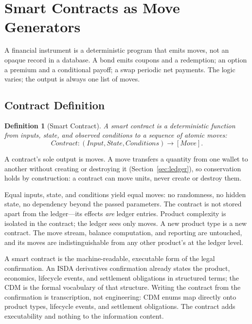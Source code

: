 \documentclass[11pt,a4paper]{article}
\newtheorem{definition}{Definition}[section]
\begin{document}
\section{Smart Contracts as Move Generators}
\label{sec:contracts}

A financial instrument is a deterministic program that emits moves, not an opaque record in a database. A bond emits coupons and a redemption; an option a premium and a conditional payoff; a swap periodic net payments. The logic varies; the output is always one list of moves.

\subsection{Contract Definition}

\begin{definition}[Smart Contract]
A smart contract is a deterministic function from inputs, state, and observed conditions to a sequence of atomic moves:
\[
\textit{Contract} : (\textit{Input}, \textit{State}, \textit{Conditions}) \to [\textit{Move}].
\]
\end{definition}

\noindent A contract's sole output is moves. A move transfers a quantity from one wallet to another without creating or destroying it (Section~\ref{sec:ledger}), so conservation holds by construction: a contract can move units, never create or destroy them.

\noindent Equal inputs, state, and conditions yield equal moves: no randomness, no hidden state, no dependency beyond the passed parameters. The contract is not stored apart from the ledger---its effects \emph{are} ledger entries. Product complexity is isolated in the contract; the ledger sees only moves. A new product type is a new contract. The move stream, balance computation, and reporting are untouched, and its moves are indistinguishable from any other product's at the ledger level.

A smart contract is the machine-readable, executable form of the legal confirmation. An ISDA derivatives confirmation already states the product, economics, lifecycle events, and settlement obligations in structured terms; the CDM is the formal vocabulary of that structure. Writing the contract from the confirmation is transcription, not engineering: CDM enums map directly onto product types, lifecycle events, and settlement obligations. The contract adds executability and nothing to the information content.
\end{document}
